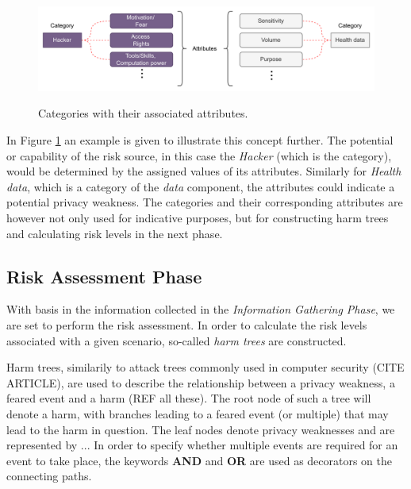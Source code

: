 \begin{figure}[hbt!]
  \centering
  \includegraphics[width=\textwidth]{pictures/cat_att.png}
  \caption{}{Categories with their associated attributes.}
  \label{fig:cat_att}
\end{figure}

In Figure \ref{fig:cat_att} an example is given to illustrate this concept
further. The potential or capability of the risk source, in this case the
\textit{Hacker} (which is the category), would be determined by the assigned
values of its attributes. Similarly for \textit{Health data}, which is a
category of the \textit{data} component, the attributes could indicate a
potential privacy weakness. The categories and their corresponding attributes
are however not only used for indicative purposes, but for constructing harm
trees and calculating risk levels in the next phase.

\subsection{Risk Assessment Phase}
With basis in the information collected in the \textit{Information Gathering
Phase}, we are set to perform the risk assessment. In order to calculate the
risk levels associated with a given scenario, so-called \textit{harm trees} are
constructed.

Harm trees, similarily to attack trees commonly used in computer security (CITE
ARTICLE), are used to describe the relationship between a privacy weakness, a
feared event and a harm (REF all these). The root node of such a tree will
denote a harm, with branches leading to a feared event (or multiple) that may
lead to the harm in question. The leaf nodes denote privacy weaknesses and are
represented by ... In order to specify whether multiple events are required for
an event to take place, the keywords \textbf{AND} and \textbf{OR} are used as
decorators on the connecting paths.
